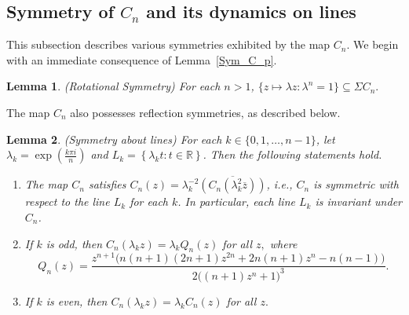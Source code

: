 \documentclass[12pt]{article}
\newtheorem{lem}{Lemma}[section]
\begin{document}
	\subsection{Symmetry of $C_n$ and its dynamics on lines}    
This subsection describes various symmetries exhibited by the map $C_n$.
We begin with an immediate consequence of Lemma~\ref{Sym_C_p}.
\begin{lem}(Rotational Symmetry)
	For each $n>1$, 
	$\{z\mapsto \lambda z: \lambda^n =1\}\subseteq\Sigma C_n.$
	\label{rot-symm}\end{lem} 
The map $C_n$ also possesses reflection symmetries, as described below.
\begin{lem}(Symmetry about  lines) \label{Inv_lines_ref-sym}
	For each $k \in \{ 0, 1, \dots, n-1\}$, let $\lambda_{k} = \exp\left(\frac{k\pi i}{n}\right)$ and  $L_{k} = \left\{ \lambda_k t : t \in \mathbb{R}\right\}$. Then the following statements hold.
	\begin{enumerate}
		\item The map $C_{n}$ satisfies $C_n (z)=\lambda_k ^{-2} \overline{(C_n (\lambda_k ^2 \overline{z}))}$, i.e., $C_n$ is symmetric with respect to the line $L_k$ for each $k$. In particular, each line $L_k$ is invariant under $C_{n}$. 
		\item If  $k$ is odd, then 
	$C_{n}(\lambda_{k} z) = \lambda_{k} Q_n (z)$ for all $z,$  where 
	\begin{equation}
		Q_n(z)= \frac{z^{n+1} \big(n(n+1)(2n+1)z^{2n} + 2n(n+1)z^{n} - n(n-1)\big)}{2\big((n+1)z^{n} + 1\big)^3}.
		\label{Q_conj} 
	\end{equation} 
		\item 	If $k$ is even, then 
		$C_{n}(\lambda_{k} z) = \lambda_{k} C_{n}(z)$ for all $z.$ 
	
	\end{enumerate}  
\end{lem}
\end{document}
